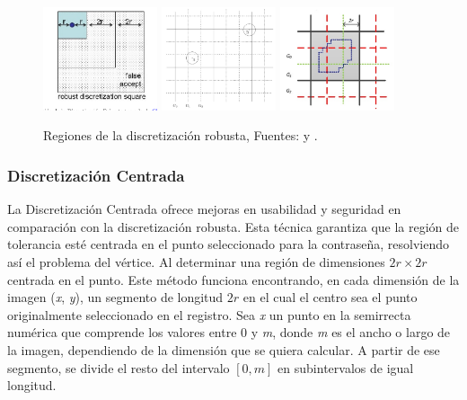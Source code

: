 		\begin{figure}[H]
			\centering
			\includegraphics[width=0.3\textwidth]{image4.png}
			\includegraphics[width=0.3\textwidth]{image2.png}
			\includegraphics[width=0.3\textwidth]{image3.png}
			\caption{Regiones de la discretizaci\'on robusta, Fuentes: \cite{zhu2013security} y \cite{chiasson2008centered}.}
		\end{figure}
	
\subsubsection{Discretización Centrada}
	
La Discretización Centrada \cite{chiasson2008centered} ofrece mejoras en usabilidad y seguridad en comparación con la discretización robusta. Esta técnica garantiza que la región de tolerancia esté centrada en el punto seleccionado para la contraseña, resolviendo así el problema del vértice. Al determinar una región de dimensiones \(2r \times 2r\) centrada en el punto. Este método funciona encontrando, en cada dimensión de la imagen (\textit{x}, \textit{y}), un segmento de longitud \(2r\) en el cual el centro sea el punto originalmente seleccionado en el registro. Sea \textit{x} un punto en la semirrecta numérica que comprende los valores entre 0 y \textit{m}, donde \textit{m} es el ancho o largo de la imagen, dependiendo de la dimensión que se quiera calcular. A partir de ese segmento, se divide el resto del intervalo $[0, m]$ en subintervalos de igual longitud.

